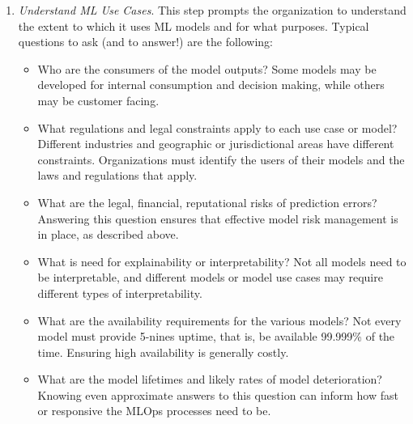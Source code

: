 \begin{enumerate}
\item \emph{Understand ML Use Cases}. This step prompts the organization to understand the extent to which it uses ML models and for what purposes. Typical questions to ask (and to answer!) are the following:
\begin{itemize}
  \item Who are the consumers of the model outputs? Some models may be developed for internal consumption and decision making, while others may be customer facing.
  \item What regulations and legal constraints apply to each use case or model? Different industries and geographic or jurisdictional areas have different constraints. Organizations must identify the users of their models and the laws and regulations that apply. 
  \item What are the legal, financial, reputational risks of prediction errors? Answering this question ensures that effective model risk management is in place, as described above. 
  \item What is need for explainability or interpretability? Not all models need to be interpretable, and different models or model use cases may require different types of interpretability.
  \item What are the availability requirements for the various models? Not every model must provide 5-nines uptime, that is, be available 99.999\% of the time. Ensuring high availability is generally costly. 
  \item What are the model lifetimes and likely rates of model deterioration? Knowing even approximate answers to this question can inform how fast or responsive the MLOps processes need to be. 
\end{itemize}


\end{enumerate}
